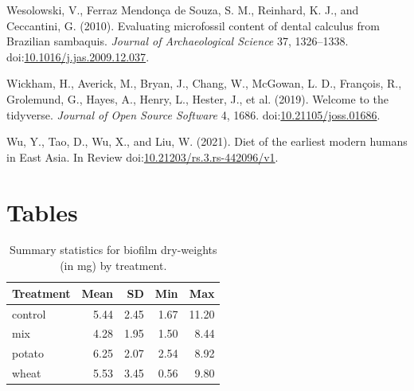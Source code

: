 \documentclass[utf8]{frontiers/frontiersSCNS}
\newlength{\cslhangindent}
\newlength{\cslentryspacingunit} %
\newenvironment{CSLReferences}[2] %
 {%
  \setlength{\parindent}{0pt}
  \ifodd #1
  \let\oldpar\par
  \def\par{\hangindent=\cslhangindent\oldpar}
  \fi
  \setlength{\parskip}{#2\cslentryspacingunit}
 }%
 {}
\begin{document}
\begin{CSLReferences}{1}{0}
\leavevmode{}%
Wesolowski, V., Ferraz Mendonça de Souza, S. M., Reinhard, K. J., and Ceccantini, G. (2010). Evaluating microfossil content of dental calculus from {Brazilian} sambaquis. \emph{Journal of Archaeological Science} 37, 1326--1338. doi:\href{https://doi.org/10.1016/j.jas.2009.12.037}{10.1016/j.jas.2009.12.037}.

\leavevmode{}%
Wickham, H., Averick, M., Bryan, J., Chang, W., McGowan, L. D., François, R., Grolemund, G., Hayes, A., Henry, L., Hester, J., et al. (2019). Welcome to the {tidyverse}. \emph{Journal of Open Source Software} 4, 1686. doi:\href{https://doi.org/10.21105/joss.01686}{10.21105/joss.01686}.

\leavevmode{}%
Wu, Y., Tao, D., Wu, X., and Liu, W. (2021). Diet of the earliest modern humans in {East Asia}. {In Review} doi:\href{https://doi.org/10.21203/rs.3.rs-442096/v1}{10.21203/rs.3.rs-442096/v1}.

\end{CSLReferences}

\clearpage

\hypertarget{tables}{%
\section*{Tables}\label{tables}}

\begin{table}

\caption{\label{tab:anova-tbl}Summary statistics for biofilm dry-weights (in mg) by treatment.}
\centering
\begin{tabular}[t]{l|r|r|r|r}
\hline
Treatment & Mean & SD & Min & Max\\
\hline
control & 5.44 & 2.45 & 1.67 & 11.20\\
\hline
mix & 4.28 & 1.95 & 1.50 & 8.44\\
\hline
potato & 6.25 & 2.07 & 2.54 & 8.92\\
\hline
wheat & 5.53 & 3.45 & 0.56 & 9.80\\
\hline
\end{tabular}
\end{table}
\end{document}
